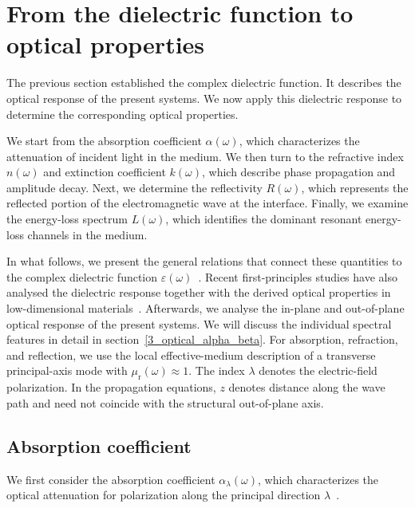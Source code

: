 \newpage
\section{From the dielectric function to optical properties}
\label{sec:from_dielectric_function_to_optical_properties}

The previous section established the complex dielectric function.
It describes the optical response of the present systems.
We now apply this dielectric response to determine the
corresponding optical properties.

We start from the absorption coefficient $\alpha(\omega)$,
which characterizes the attenuation of incident light in the
medium.
We then turn to the refractive index $n(\omega)$ and extinction
coefficient $k(\omega)$, which describe phase propagation and
amplitude decay.
Next, we determine the reflectivity $R(\omega)$, which
represents the reflected portion of the electromagnetic wave at
the interface.
Finally, we examine the energy-loss spectrum $L(\omega)$,
which identifies the dominant resonant energy-loss channels in the medium.

In what follows, we present the general relations that
connect these quantities to the complex dielectric function $\varepsilon(\omega)$~\cite{born2013principles,wooten2013optical,dressel2002electrodynamics,fox2010optical}.
Recent first-principles studies have also analysed the dielectric response together with the derived optical properties in low-dimensional materials~\cite{niu2024electronic,khan2025insight,albert2024optical,huang2023optical,cheng2025two}.
Afterwards, we analyse the in-plane and out-of-plane optical response of the present systems.
We will discuss the individual spectral features in detail in section~\ref{3_optical_alpha_beta}.
For absorption, refraction, and reflection, we use the local effective-medium description of a transverse principal-axis mode with $\mu_{\mathrm{r}}(\omega)\approx1$.
The index $\lambda$ denotes the electric-field polarization.
In the propagation equations, $z$ denotes distance along the wave path and need not coincide with the structural out-of-plane axis.

\subsection{Absorption coefficient}

We first consider the absorption coefficient $\alpha_{\lambda}(\omega)$,
which characterizes the optical attenuation for polarization along the principal direction $\lambda$~\cite{lin2023recent}.

